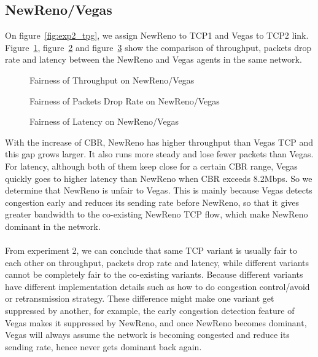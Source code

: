 \documentclass[10pt, conference]{lib/IEEEtran}
\begin{document}
\subsection{NewReno/Vegas}
On figure~\ref{fig:exp2_tpg}, we assign NewReno to TCP1 and Vegas to TCP2 link. Figure~\ref{fig:exp2_thp_nv}, 
figure~\ref{fig:exp2_dr_nv} and figure~\ref{fig:exp2_lt_nv} show the comparison of throughput, packets drop rate and 
latency between the NewReno and Vegas agents in the same network.
\vspace{-0.2in}
\begin{figure}[H]
    \centering
    \resizebox{0.9\linewidth}{!}{}
    \caption{Fairness of Throughput on NewReno/Vegas}
    \label{fig:exp2_thp_nv}
\end{figure}
\vspace{-0.3in}
\begin{figure}[H]
    \centering
    \resizebox{0.9\linewidth}{!}{}
    \caption{Fairness of Packets Drop Rate on NewReno/Vegas}
    \label{fig:exp2_dr_nv}
\end{figure}
\vspace{-0.3in}
\begin{figure}[H]
    \centering
    \resizebox{0.9\linewidth}{!}{}
    \caption{Fairness of Latency on NewReno/Vegas}
    \label{fig:exp2_lt_nv}
\end{figure}
With the increase of CBR, NewReno has higher throughput than Vegas TCP and this gap grows larger. It also runs 
more steady and lose fewer packets than Vegas. For latency, although both of them keep close for a certain CBR 
range, Vegas quickly goes to higher latency than NewReno when CBR exceeds 8.2Mbps. So we determine that NewReno 
is unfair to Vegas. This is mainly because Vegas detects congestion early and reduces its sending rate before NewReno, 
so that it gives greater bandwidth to the co-existing NewReno TCP flow, which make NewReno dominant in the network.\\\\
From experiment 2, we can conclude that same TCP variant is usually fair to each other on throughput, packets drop 
rate and latency, while different variants cannot be completely fair to the co-existing variants. Because different 
variants have different implementation details such as how to do congestion control/avoid or retransmission strategy. 
These difference might make one variant get suppressed by another, for example, the early congestion detection feature 
of Vegas makes it suppressed by NewReno, and once NewReno becomes dominant, Vegas will always assume the network is 
becoming congested and reduce its sending rate, hence never gets dominant back again.
\end{document}
